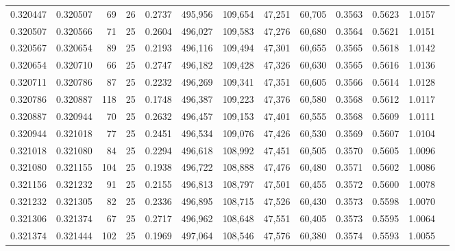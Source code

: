 \begin{tabular}{rrrrrrrrrrrrr}
0.320447 & 0.320507 &    69 &  26 &                                     0.2737 & 495,956 & 109,654 &  47,251 &  60,705 & 0.3563 & 0.5623 & 1.0157 \\
0.320507 & 0.320566 &    71 &  25 &                                     0.2604 & 496,027 & 109,583 &  47,276 &  60,680 & 0.3564 & 0.5621 & 1.0151 \\
0.320567 & 0.320654 &    89 &  25 &                                     0.2193 & 496,116 & 109,494 &  47,301 &  60,655 & 0.3565 & 0.5618 & 1.0142 \\
0.320654 & 0.320710 &    66 &  25 &                                     0.2747 & 496,182 & 109,428 &  47,326 &  60,630 & 0.3565 & 0.5616 & 1.0136 \\
0.320711 & 0.320786 &    87 &  25 &                                     0.2232 & 496,269 & 109,341 &  47,351 &  60,605 & 0.3566 & 0.5614 & 1.0128 \\
0.320786 & 0.320887 &   118 &  25 &                                     0.1748 & 496,387 & 109,223 &  47,376 &  60,580 & 0.3568 & 0.5612 & 1.0117 \\
0.320887 & 0.320944 &    70 &  25 &                                     0.2632 & 496,457 & 109,153 &  47,401 &  60,555 & 0.3568 & 0.5609 & 1.0111 \\
0.320944 & 0.321018 &    77 &  25 &                                     0.2451 & 496,534 & 109,076 &  47,426 &  60,530 & 0.3569 & 0.5607 & 1.0104 \\
0.321018 & 0.321080 &    84 &  25 &                                     0.2294 & 496,618 & 108,992 &  47,451 &  60,505 & 0.3570 & 0.5605 & 1.0096 \\
0.321080 & 0.321155 &   104 &  25 &                                     0.1938 & 496,722 & 108,888 &  47,476 &  60,480 & 0.3571 & 0.5602 & 1.0086 \\
0.321156 & 0.321232 &    91 &  25 &                                     0.2155 & 496,813 & 108,797 &  47,501 &  60,455 & 0.3572 & 0.5600 & 1.0078 \\
0.321232 & 0.321305 &    82 &  25 &                                     0.2336 & 496,895 & 108,715 &  47,526 &  60,430 & 0.3573 & 0.5598 & 1.0070 \\
0.321306 & 0.321374 &    67 &  25 &                                     0.2717 & 496,962 & 108,648 &  47,551 &  60,405 & 0.3573 & 0.5595 & 1.0064 \\
0.321374 & 0.321444 &   102 &  25 &                                     0.1969 & 497,064 & 108,546 &  47,576 &  60,380 & 0.3574 & 0.5593 & 1.0055 \\

\end{tabular}
